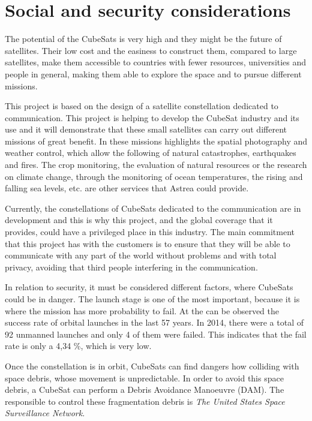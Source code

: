 \chapter{Social and security considerations}
The potential of the CubeSats is very high and they might be the future of satellites. Their low cost and the easiness to construct them, compared to large satellites, make them accessible to countries with fewer resources, universities and people in general, making them able to explore the space and to pursue different missions.

This project is based on the design of a satellite constellation dedicated to communication. This project is helping to develop the CubeSat industry and its use and it will demonstrate that these small satellites can carry out different missions of great benefit. In these missions highlights the spatial photography and weather control, which allow the following of natural catastrophes, earthquakes and fires. The crop monitoring, the evaluation of natural resources or the research on climate change, through the monitoring of ocean temperatures, the rising and falling sea levels, etc. are other services that Astrea could provide. 

Currently, the constellations of CubeSats dedicated to the communication are in development and this is why this project, and the global coverage that it provides, could have a privileged place in this industry. The main commitment that this project has with the customers is to ensure that they will be able to communicate with any part of the world without problems and with total privacy, avoiding that third people interfering in the communication.

In relation to security, it must be considered different factors, where CubeSats could be in danger. The launch stage is one of the most important, because it is where the mission has more probability to fail. At the \cite[Chapter 4]{annex5} can be observed the success rate of orbital launches in the last 57 years. In 2014, there were a total of 92 unmanned launches and only 4 of them were failed. This indicates that the fail rate is only a 4,34 \%, which is very low. 

Once the constellation is in orbit, CubeSats can find dangers how colliding with space debris, whose movement is unpredictable. In order to avoid this space debris, a CubeSat can perform a Debris Avoidance Manoeuvre (DAM). The responsible to control these fragmentation debris is \textit{The United States Space Surveillance Network}.
